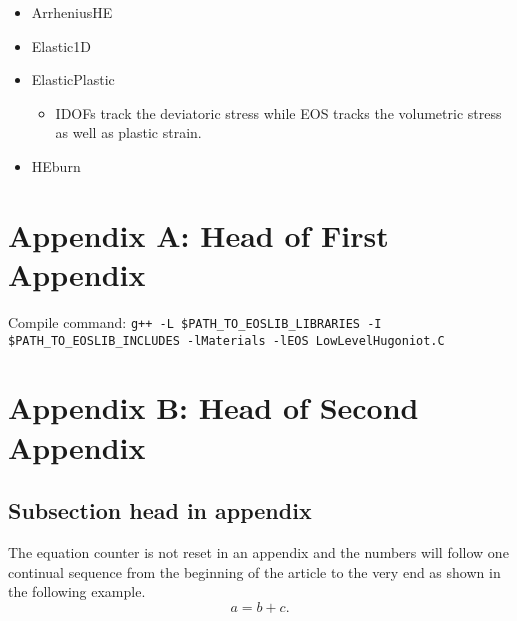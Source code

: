 \documentclass[twocolumn,10pt]{asme2ej}
\begin{document}
\begin{itemize}
	\item ArrheniusHE
	\item Elastic1D
	\item ElasticPlastic
		\begin{itemize}
			\item IDOFs track the deviatoric stress while EOS tracks the volumetric stress as well as plastic strain.
		\end{itemize}
	\item HEburn
\end{itemize}





\appendix       %
\section*{Appendix A: Head of First Appendix}
Compile command: \verb!g++ -L $PATH_TO_EOSLIB_LIBRARIES -I $PATH_TO_EOSLIB_INCLUDES -lMaterials -lEOS LowLevelHugoniot.C!

\section*{Appendix B: Head of Second Appendix}
\subsection*{Subsection head in appendix}
The equation counter is not reset in an appendix and the numbers will
follow one continual sequence from the beginning of the article to the very end as shown in the following example.
\begin{equation}
a = b + c.
\end{equation}
\end{document}
